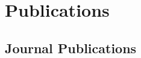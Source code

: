 \section{\sc Publications}
                                       
                                       \vspace{-0.5cm}
                                       
                                       \subsection{\small \sc Journal Publications}
                                       \vspace{-0.6cm}
                                       
